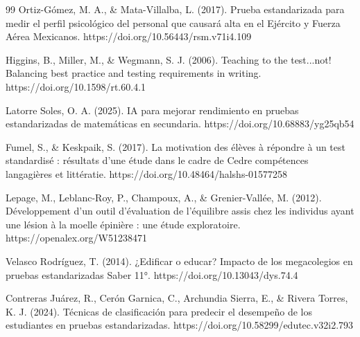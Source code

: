 \documentclass[11pt]{article}
\begin{document}
\begin{thebibliography}{99}
Ortiz-Gómez, M. A., \& Mata-Villalba, L. (2017). Prueba estandarizada para medir el perfil psicológico del personal que causará alta en el Ejército y Fuerza Aérea Mexicanos. https://doi.org/10.56443/rsm.v71i4.109

Higgins, B., Miller, M., \& Wegmann, S. J. (2006). Teaching to the test...not! Balancing best practice and testing requirements in writing. https://doi.org/10.1598/rt.60.4.1

Latorre Soles, O. A. (2025). IA para mejorar rendimiento en pruebas estandarizadas de matemáticas en secundaria. https://doi.org/10.68883/yg25qb54

Fumel, S., \& Keskpaik, S. (2017). La motivation des \'el\`eves \`a r\'epondre \`a un test standardis\'e : r\'esultats d'une \'etude dans le cadre de Cedre comp\'etences langagi\`eres et litt\'eratie. https://doi.org/10.48464/halshs-01577258

Lepage, M., Leblanc-Roy, P., Champoux, A., \& Grenier-Vall\'ee, M. (2012). D\'eveloppement d'un outil d'\'evaluation de l'\'equilibre assis chez les individus ayant une l\'esion \`a la moelle \'epini\`ere : une \'etude exploratoire. https://openalex.org/W51238471

Velasco Rodríguez, T. (2014). ¿Edificar o educar? Impacto de los megacolegios en pruebas estandarizadas Saber 11°. https://doi.org/10.13043/dys.74.4

Contreras Juárez, R., Cerón Garnica, C., Archundia Sierra, E., \& Rivera Torres, K. J. (2024). Técnicas de clasificación para predecir el desempeño de los estudiantes en pruebas estandarizadas. https://doi.org/10.58299/edutec.v32i2.793

\end{thebibliography}
\end{document}
